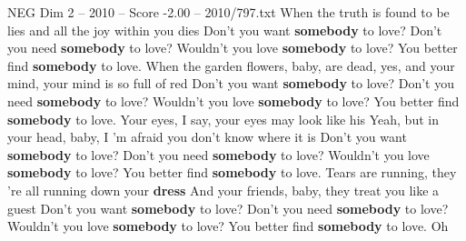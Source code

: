 \begin{textsample}{NEG Dim 2 – 2010 – Score -2.00 – 2010/797.txt}  \label{ex:f2_neg_009}
When the truth is found to be lies and all the joy within you dies Don't you want \textbf{somebody} to love?
Don't you need \textbf{somebody} to love?
Wouldn't you love \textbf{somebody} to love?
You better find \textbf{somebody} to love.
When the garden flowers, baby, are dead, yes, and your mind, your mind is so full of red Don't you want \textbf{somebody} to love?
Don't you need \textbf{somebody} to love?
Wouldn't you love \textbf{somebody} to love?
You better find \textbf{somebody} to love.
Your eyes, I say, your eyes may look like his Yeah, but in your head, baby, I 'm afraid you don't know where it is Don't you want \textbf{somebody} to love?
Don't you need \textbf{somebody} to love?
Wouldn't you love \textbf{somebody} to love?
You better find \textbf{somebody} to love.
Tears are running, they 're all running down your \textbf{dress} And your friends, baby, they treat you like a guest Don't you want \textbf{somebody} to love?
Don't you need \textbf{somebody} to love?
Wouldn't you love \textbf{somebody} to love?
You better find \textbf{somebody} to love.
Oh

\end{textsample}
